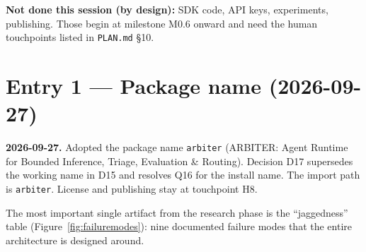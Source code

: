 \textbf{Not done this session (by design):} SDK code, API keys, experiments, publishing.
Those begin at milestone M0.6 onward and need the human touchpoints listed in
\texttt{PLAN.md} \S10.

\section*{Entry 1 --- Package name (2026-09-27)}

\textbf{2026-09-27.} Adopted the package name \texttt{arbiter} (ARBITER: Agent Runtime
for Bounded Inference, Triage, Evaluation \& Routing). Decision D17 supersedes the
working name in D15 and resolves Q16 for the install name. The import path is
\texttt{arbiter}. License and publishing stay at touchpoint H8.

\begin{keyidea}
The most important single artifact from the research phase is the ``jaggedness'' table
(Figure~\ref{fig:failuremodes}): nine documented failure modes that the entire architecture is
designed around.
\end{keyidea}
